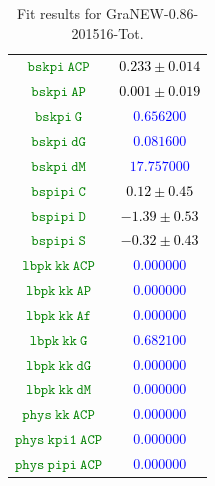 \documentclass[10pt,a4paper]{article}
\begin{document}
\begin{table}[h!]
\begin{tabular}{cc}
\textcolor{Green}{$\mathtt{bskpi~ACP~}$} & \textcolor{black}{$0.233 \pm 0.014$}\\
\textcolor{Green}{$\mathtt{bskpi~AP~}$} & \textcolor{black}{$0.001 \pm 0.019$}\\
\textcolor{Green}{$\mathtt{bskpi~G~}$} & \textcolor{blue}{$0.656200$}\\
\textcolor{Green}{$\mathtt{bskpi~dG~}$} & \textcolor{blue}{$0.081600$}\\
\textcolor{Green}{$\mathtt{bskpi~dM~}$} & \textcolor{blue}{$17.757000$}\\
\textcolor{Green}{$\mathtt{bspipi~C~}$} & \textcolor{black}{$0.12 \pm 0.45$}\\
\textcolor{Green}{$\mathtt{bspipi~D~}$} & \textcolor{black}{$-1.39 \pm 0.53$}\\
\textcolor{Green}{$\mathtt{bspipi~S~}$} & \textcolor{black}{$-0.32 \pm 0.43$}\\
\textcolor{Green}{$\mathtt{lbpk~kk~ACP~}$} & \textcolor{blue}{$0.000000$}\\
\textcolor{Green}{$\mathtt{lbpk~kk~AP~}$} & \textcolor{blue}{$0.000000$}\\
\textcolor{Green}{$\mathtt{lbpk~kk~Af~}$} & \textcolor{blue}{$0.000000$}\\
\textcolor{Green}{$\mathtt{lbpk~kk~G~}$} & \textcolor{blue}{$0.682100$}\\
\textcolor{Green}{$\mathtt{lbpk~kk~dG~}$} & \textcolor{blue}{$0.000000$}\\
\textcolor{Green}{$\mathtt{lbpk~kk~dM~}$} & \textcolor{blue}{$0.000000$}\\
\textcolor{Green}{$\mathtt{phys~kk~ACP~}$} & \textcolor{blue}{$0.000000$}\\
\textcolor{Green}{$\mathtt{phys~kpi1~ACP~}$} & \textcolor{blue}{$0.000000$}\\
\textcolor{Green}{$\mathtt{phys~pipi~ACP~}$} & \textcolor{blue}{$0.000000$}\\
\hline
\end{tabular}
\caption{Fit results for GraNEW-0.86-201516-Tot.}
\label{tab:GraNEW_0.86_201516_Tot}
\end{table}
\end{document}
